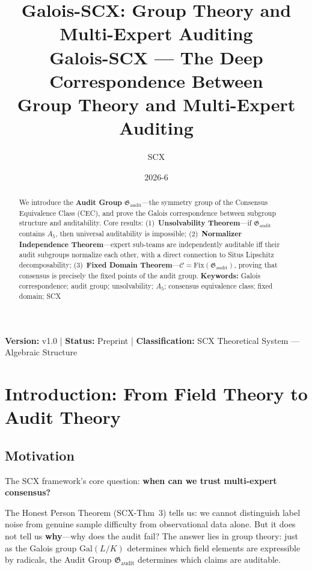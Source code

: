\documentclass[12pt,a4paper]{article}
\title{\textbf{Galois-SCX: Group Theory and Multi-Expert Auditing}\\[4pt]
\large Galois-SCX --- The Deep Correspondence Between\\[2pt]
Group Theory and Multi-Expert Auditing}
\author{SCX}
\date{2026-6}
\theoremstyle{remark}
\newcommand{\Gal}{\mathrm{Gal}}
\newcommand{\Fix}{\mathrm{Fix}}
\newcommand{\AuditGrp}{\mathfrak{G}_{\mathrm{audit}}}
\newcommand{\CEC}{\mathcal{C}}
\begin{document}
\maketitle
\begin{center}
\footnotesize
\textbf{Version: } v1.0 \quad | \quad
\textbf{Status:} Preprint \quad | \quad
\textbf{Classification:} SCX Theoretical System --- Algebraic Structure
\end{center}
\begin{abstract}
We introduce the \textbf{Audit Group} \(\AuditGrp\)---the symmetry group of the Consensus Equivalence Class (CEC), and prove the Galois correspondence between subgroup structure and auditability. Core results: (1)~\textbf{Unsolvability Theorem}---if \(\AuditGrp\) contains \(A_5\), then universal auditability is impossible; (2)~\textbf{Normalizer Independence Theorem}---expert sub-teams are independently auditable iff their audit subgroups normalize each other, with a direct connection to Situs Lipschitz decomposability; (3)~\textbf{Fixed Domain Theorem}---\(\CEC = \Fix(\AuditGrp)\), proving that consensus is precisely the fixed points of the audit group.
\textbf{Keywords:} Galois correspondence; audit group; unsolvability; \(A_5\); consensus equivalence class; fixed domain; SCX
\end{abstract}
\tableofcontents
\newpage
\section{Introduction: From Field Theory to Audit Theory}
\subsection{Motivation}
The SCX framework's core question: \textbf{when can we trust multi-expert consensus?}

The Honest Person Theorem (SCX-Thm~3) tells us: we cannot distinguish label noise from genuine sample difficulty from observational data alone. But it does not tell us \textbf{why}---why does the audit fail? The answer lies in group theory: just as the Galois group \(\Gal(L/K)\) determines which field elements are expressible by radicals, the Audit Group \(\AuditGrp\) determines which claims are auditable.
\end{document}
